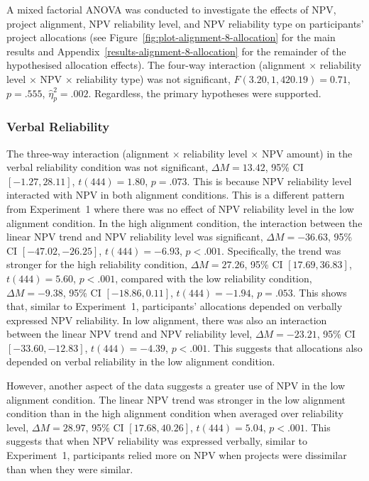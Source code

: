 \documentclass[
  english,
  man, donotrepeattitle,floatsintext]{apa7}
\theoremstyle{definition}
\theoremstyle{definition}
\theoremstyle{definition}
\theoremstyle{definition}
\theoremstyle{remark}
\begin{document}
A mixed factorial ANOVA was conducted to investigate the effects of NPV, project
alignment, NPV reliability level, and NPV reliability type on participants'
project allocations (see Figure~\ref{fig:plot-alignment-8-allocation} for the
main results and Appendix~\ref{results-alignment-8-allocation} for the
remainder of the hypothesised allocation effects). The four-way interaction
(alignment \(\times\) reliability level \(\times\) NPV \(\times\) reliability type)
was not significant, \(F(3.20, 1,420.19) = 0.71\), \(p = .555\), \(\hat{\eta}^2_p = .002\). Regardless,
the primary hypotheses were supported.

\hypertarget{verbal-reliability}{%
\subsubsection{Verbal Reliability}\label{verbal-reliability}}

The three-way interaction (alignment \(\times\) reliability level \(\times\) NPV
amount) in the verbal reliability condition was not significant,
\(\Delta M = 13.42\), 95\% CI \([-1.27, 28.11]\), \(t(444) = 1.80\), \(p = .073\). This is
because NPV reliability level interacted with NPV in both alignment conditions.
This is a different pattern from Experiment~1 where there was no effect of NPV
reliability level in the low alignment condition. In the high alignment
condition, the interaction between the linear NPV trend and NPV reliability
level was significant,
\(\Delta M = -36.63\), 95\% CI \([-47.02, -26.25]\), \(t(444) = -6.93\), \(p < .001\).
Specifically, the trend was stronger for the high reliability condition,
\(\Delta M = 27.26\), 95\% CI \([17.69, 36.83]\), \(t(444) = 5.60\), \(p < .001\),
compared with the low reliability condition,
\(\Delta M = -9.38\), 95\% CI \([-18.86, 0.11]\), \(t(444) = -1.94\), \(p = .053\).
This shows that, similar to Experiment~1, participants' allocations depended on
verbally expressed NPV reliability. In low alignment, there was also an
interaction between the linear NPV trend and NPV reliability level,
\(\Delta M = -23.21\), 95\% CI \([-33.60, -12.83]\), \(t(444) = -4.39\), \(p < .001\).
This suggests that allocations also depended on verbal reliability in the low
alignment condition.

However, another aspect of the data suggests a greater use of NPV in the low
alignment condition. The linear NPV trend was stronger in the low
alignment condition than in the high alignment condition when averaged over
reliability level,
\(\Delta M = 28.97\), 95\% CI \([17.68, 40.26]\), \(t(444) = 5.04\), \(p < .001\). This
suggests that when NPV reliability was expressed verbally, similar to
Experiment~1, participants relied more on NPV when projects were dissimilar than
when they were similar.
\end{document}
